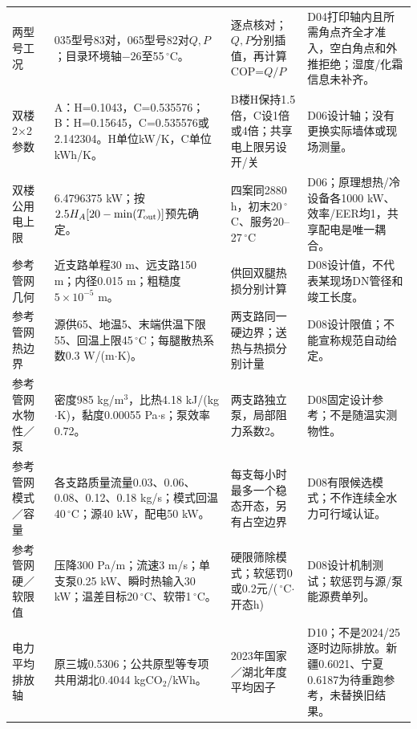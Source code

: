 \begin{longtable}{@{}L{0.16\textwidth}L{0.32\textwidth}L{0.23\textwidth}L{0.21\textwidth}@{}}
两型号工况 & 035型号83对，065型号82对$Q,P$；目录环境轴$-26$至55\,${}^{\circ}$C。 & 逐点核对；$Q,P$分别插值，再计算COP=$Q/P$ & D04打印轴内且所需角点齐全才准入，空白角点和外推拒绝；湿度/化霜信息未补齐。 \\
双楼2×2参数 & A：H=0.1043，C=0.535576；B：H=0.15645，C=0.535576或2.142304。H单位kW/K，C单位kWh/K。 & B楼H保持1.5倍，C设1倍或4倍；共享电上限另设开/关 & D06设计轴；没有更换实际墙体或现场测量。 \\
双楼公用电上限 & 6.4796375 kW；按$2.5H_A[20-\min(T_{\rm out})]$预先确定。 & 四案同2880 h，初末20\,${}^{\circ}$C、服务20--27\,${}^{\circ}$C & D06；原理想热/冷设备各1000 kW、效率/EER均1，共享配电是唯一耦合。 \\
参考管网几何 & 近支路单程30 m、远支路150 m；内径0.015 m；粗糙度$5\times10^{-5}$ m。 & 供回双腿热损分别计算 & D08设计值，不代表某现场DN管径和竣工长度。 \\
参考管网热边界 & 源供65、地温5、末端供温下限55、回温上限45\,${}^{\circ}$C；每腿散热系数0.3 W/(m$\cdot$K)。 & 两支路同一硬边界；送热与热损分别计量 & D08设计限值；不能宣称规范自动给定。 \\
参考管网水物性／泵 & 密度985 kg/m$^3$，比热4.18 kJ/(kg$\cdot$K)，黏度0.00055 Pa$\cdot$s；泵效率0.72。 & 两支路独立泵，局部阻力系数2。 & D08固定设计参考；不是随温实测物性。 \\
参考管网模式／容量 & 各支路质量流量0.03、0.06、0.08、0.12、0.18 kg/s；模式回温40\,${}^{\circ}$C；源40 kW，配电50 kW。 & 每支每小时最多一个稳态开态，另有占空边界 & D08有限候选模式；不作连续全水力可行域认证。 \\
参考管网硬／软限值 & 压降300 Pa/m；流速3 m/s；单支泵0.25 kW、瞬时热输入30 kW；温差目标20\,${}^{\circ}$C、软带1\,${}^{\circ}$C。 & 硬限筛除模式；软惩罚0或0.2元/(\,${}^{\circ}$C$\cdot$开态h) & D08设计机制测试；软惩罚与源/泵能源费单列。 \\
电力平均排放轴 & 原三城0.5306；公共原型等专项共用湖北0.4044 kgCO$_2$/kWh。 & 2023年国家／湖北年度平均因子 & D10；不是2024/25逐时边际排放。新疆0.6021、宁夏0.6187为待重跑参考，未替换旧结果。 \\
\end{longtable}

